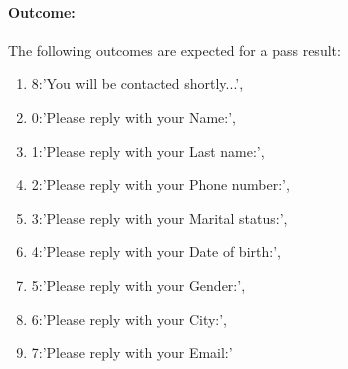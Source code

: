 \documentclass{article}
\begin{document}
\paragraph{Outcome:} The following outcomes are expected for a pass result:
\begin{enumerate}
	 \item 8:'You will be contacted shortly...',
     \item 0:'Please reply with your Name:',
     \item 1:'Please reply with your Last name:',
     \item 2:'Please reply with your Phone number:',
     \item 3:'Please reply with your Marital status:',
     \item 4:'Please reply with your Date of birth:',
     \item 5:'Please reply with your Gender:',
     \item 6:'Please reply with your City:',
     \item 7:'Please reply with your Email:'
\end{enumerate}

\pagebreak
\end{document}
